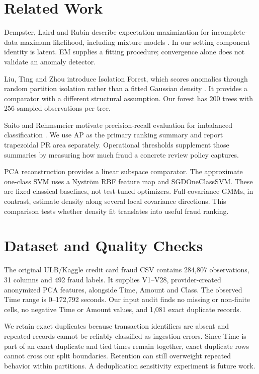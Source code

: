 \documentclass[conference]{IEEEtran}
\begin{document}
\section{Related Work}
Dempster, Laird and Rubin describe expectation-maximization for incomplete-data maximum likelihood, including mixture models \cite{em}. In our setting component identity is latent. EM supplies a fitting procedure; convergence alone does not validate an anomaly detector.

Liu, Ting and Zhou introduce Isolation Forest, which scores anomalies through random partition isolation rather than a fitted Gaussian density \cite{iforest}. It provides a comparator with a different structural assumption. Our forest has 200 trees with 256 sampled observations per tree.

Saito and Rehmsmeier motivate precision-recall evaluation for imbalanced classification \cite{pr}. We use AP as the primary ranking summary and report trapezoidal PR area separately. Operational thresholds supplement those summaries by measuring how much fraud a concrete review policy captures.

PCA reconstruction provides a linear subspace comparator. The approximate one-class SVM uses a Nystr\"om RBF feature map and SGDOneClassSVM. These are fixed classical baselines, not test-tuned optimizers. Full-covariance GMMs, in contrast, estimate density along several local covariance directions. This comparison tests whether density fit translates into useful fraud ranking.

\section{Dataset and Quality Checks}
The original ULB/Kaggle credit card fraud CSV \cite{data} contains 284,807 observations, 31 columns and 492 fraud labels. It supplies V1--V28, provider-created anonymized PCA features, alongside Time, Amount and Class. The observed Time range is 0--172,792 seconds. Our input audit finds no missing or non-finite cells, no negative Time or Amount values, and 1,081 exact duplicate records.

We retain exact duplicates because transaction identifiers are absent and repeated records cannot be reliably classified as ingestion errors. Since Time is part of an exact duplicate and tied times remain together, exact duplicate rows cannot cross our split boundaries. Retention can still overweight repeated behavior within partitions. A deduplication sensitivity experiment is future work.
\end{document}
